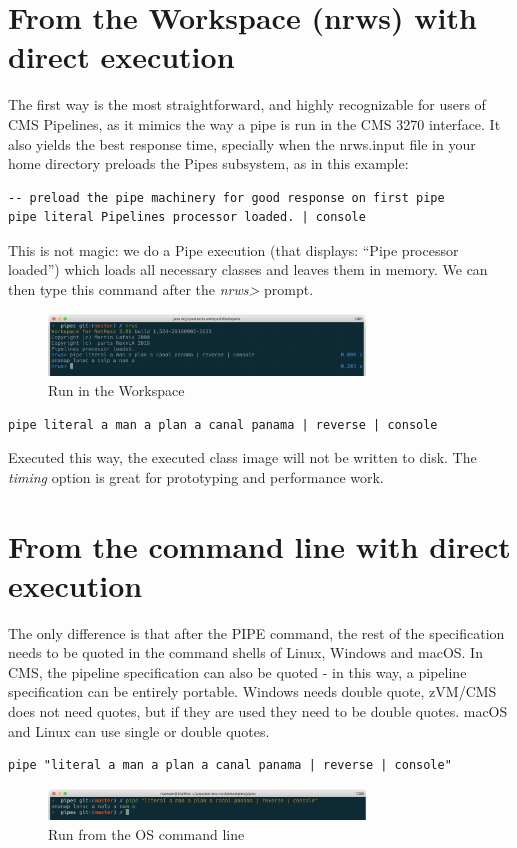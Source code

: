 \section{From the \nr{} Workspace (nrws) with direct execution}
The first way is the most straightforward, and highly recognizable for
users of CMS Pipelines, as it mimics the way a pipe is run in the CMS
3270 interface. It also yields the best response time, specially when
the nrws.input file in your home directory preloads the Pipes subsystem, as in this
example:
\begin{verbatim}
-- preload the pipe machinery for good response on first pipe
pipe literal Pipelines processor loaded. | console
\end{verbatim}
This is not magic: we do a Pipe execution (that displays: ``Pipe
processor loaded'') which loads all necessary classes and leaves them
in memory. We can then type this command after the \emph{nrws>}
prompt.
\begin{figure}[h]
  \includegraphics[width=0.75\textwidth]{images/runnrws.png}
  \caption{Run in the \nr{} Workspace}
  \label{fig:runnrws}
\end{figure}

\begin{lstlisting}
pipe literal a man a plan a canal panama | reverse | console
\end{lstlisting}
Executed this way, the executed class image will not be written to
disk. The \emph{timing} option is great for prototyping and
performance work.
\section{From the command line with direct execution}
The only difference is that after the PIPE command,
the rest of the specification needs to be quoted in the command shells
of Linux, Windows and macOS. In CMS, the pipeline specification can
also be quoted - in this way, a pipeline specification can be entirely
portable. Windows needs double quote, zVM/CMS does not need quotes,
but if they are used they need to be double quotes. macOS and Linux
can use single or double quotes.
\begin{lstlisting}
pipe "literal a man a plan a canal panama | reverse | console"
\end{lstlisting}
\begin{figure}[h]
  \includegraphics[width=0.75\textwidth]{images/runfromshell.png}
  \caption{Run from the OS command line}
  \label{fig:runfromshell}
\end{figure}

